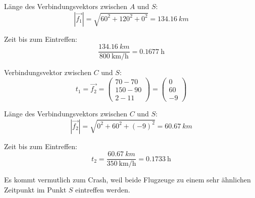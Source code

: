 \documentclass{ajc}
\numberwithin{equation}{subsection}
\begin{document}
	Länge des Verbindungsvektors zwischen $A$ und $S$:
	\begin{equation}
		\left|\overrightarrow{f_1}\right| = \sqrt{60^2 + 120^2 + 0^2} = \SI{134,16}{km}
	\end{equation}
	
	Zeit bis zum Eintreffen:
	\begin{equation}
		\frac{\SI{134,16}{km}}{\SI{800}{\km\per\hour}} = \SI{0,1677}{\hour}
	\end{equation}
	
	Verbindungsvektor zwischen $C$ und $S$:
	\begin{equation}
		t_1 = \overrightarrow{f_2} = \left(\begin{array}{r} 70 - 70 \\ 150 - 90 \\ 2 - 11\end{array}\right) = \left(\begin{array}{r} 0 \\ 60 \\ -9\end{array}\right) 
	\end{equation}
	
	Länge des Verbindungsvektors zwischen $C$ und $S$:
	\begin{equation}
		\left|\overrightarrow{f_2}\right| = \sqrt{0^2 + 60^2 + (-9)^2} = \SI{60,67}{km}
	\end{equation}
	
	Zeit bis zum Eintreffen:
	\begin{equation}
		t_2 = \frac{\SI{60,67}{km}}{\SI{350}{\km\per\hour}} = \SI{0,1733}{\hour}
	\end{equation}
	
	Es kommt vermutlich zum Crash, weil beide Flugzeuge zu einem sehr ähnlichen Zeitpunkt im Punkt $S$ eintreffen werden.
	
\end{document}
